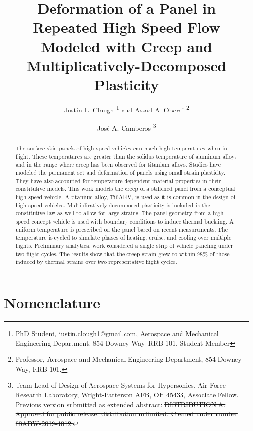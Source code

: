 \documentclass[conf]{new-aiaa}
\title{ Deformation of a Panel in Repeated High Speed Flow 
        Modeled with Creep and Multiplicatively-Decomposed Plasticity}
\author{Justin L. Clough%
        \footnote{
          PhD Student, 
          justin.clough1@gmail.com,
          Aerospace and Mechanical Engineering Department, 
          854 Downey Way, RRB 101,
          Student Member}
        and Assad A. Oberai%
        \footnote{  
          Professor, 
          Aerospace and Mechanical Engineering Department, 
          854 Downey Way, RRB 101.}}
\affil{University of Southern California,
       Los Angeles, CA, 90089}
\author{Jos\'e A. Camberos%
        \footnote{
          Team Lead of Design of Aerospace Systems for Hypersonics, 
          Air Force Research Laboratory,
          Wright-Patterson AFB, OH 45433,
          Associate Fellow.
          \newline
          \newline
          Previous version submitted as extended abstract:
            \sout{DISTRIBUTION A. Approved for public release: distribution unlimited. 
            Cleared under number 88ABW-2019-4012.}}}
\affil{Air Force Research Laboratory, Wright-Patterson AFB,
       Dayton, OH, 45433}
\begin{document}
\maketitle

\begin{abstract} %
The surface skin panels of high speed vehicles can reach high 
temperatures when in flight. 
These temperatures are greater than the solidus temperature
of aluminum alloys and in the range where
creep has been observed for titanium alloys.
Studies have modeled the permanent set and deformation 
of panels using small strain plasticity.
They have also accounted for temperature
dependent material properties in their constitutive models.
This work models the creep of a stiffened panel
from a conceptual high speed vehicle.
A titanium alloy, Ti6Al4V,
is used as it is common in the design of high speed vehicles.
Multiplicatively-decomposed plasticity 
is included in the constitutive law as well to allow for large strains.
The panel geometry from a high speed concept vehicle is
used with boundary conditions to induce thermal buckling.
A uniform temperature is prescribed on the panel
based on recent measurements.
The temperature is cycled to simulate phases of
heating, cruise, and cooling over multiple flights.
Preliminary analytical work considered a single strip
of vehicle paneling under two flight cycles.
The results show that the creep strain
grew to within 98\% of those induced by thermal strains 
over two representative flight cycles.
\end{abstract}

\section{Nomenclature} %
\end{document}
